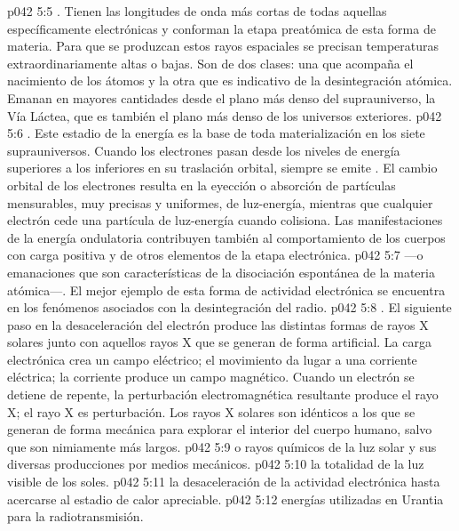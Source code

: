 \vs p042 5:5 . Tienen las longitudes de onda más cortas de todas aquellas específicamente electrónicas y conforman la etapa preatómica de esta forma de materia. Para que se produzcan estos rayos espaciales se precisan temperaturas extraordinariamente altas o bajas. Son de dos clases: una que acompaña el nacimiento de los átomos y la otra que es indicativo de la desintegración atómica. Emanan en mayores cantidades desde el plano más denso del suprauniverso, la Vía Láctea, que es también el plano más denso de los universos exteriores.
\vs p042 5:6 . Este estadio de la energía es la base de toda materialización en los siete suprauniversos. Cuando los electrones pasan desde los niveles de energía superiores a los inferiores en su traslación orbital, siempre se emite . El cambio orbital de los electrones resulta en la eyección o absorción de partículas mensurables, muy precisas y uniformes, de luz\hyp{}energía, mientras que cualquier electrón cede una partícula de luz\hyp{}energía cuando colisiona. Las manifestaciones de la energía ondulatoria contribuyen también al comportamiento de los cuerpos con carga positiva y de otros elementos de la etapa electrónica.
\vs p042 5:7  ---o emanaciones que son características de la disociación espontánea de la materia atómica---. El mejor ejemplo de esta forma de actividad electrónica se encuentra en los fenómenos asociados con la desintegración del radio.
\vs p042 5:8 . El siguiente paso en la desaceleración del electrón produce las distintas formas de rayos X solares junto con aquellos rayos X que se generan de forma artificial. La carga electrónica crea un campo eléctrico; el movimiento da lugar a una corriente eléctrica; la corriente produce un campo magnético. Cuando un electrón se detiene de repente, la perturbación electromagnética resultante produce el rayo X; el rayo X es  perturbación. Los rayos X solares son idénticos a los que se generan de forma mecánica para explorar el interior del cuerpo humano, salvo que son nimiamente más largos.
\vs p042 5:9  o rayos químicos de la luz solar y sus diversas producciones por medios mecánicos.
\vs p042 5:10  la totalidad de la luz visible de los soles.
\vs p042 5:11  la desaceleración de la actividad electrónica hasta acercarse al estadio de calor apreciable.
\vs p042 5:12  energías utilizadas en Urantia para la radiotransmisión.
